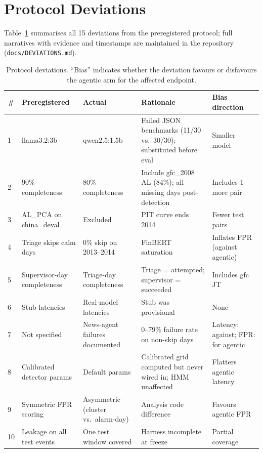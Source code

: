 \documentclass[10pt,a4paper]{article}
\begin{document}
\appendix

\section{Protocol Deviations}\label{app:deviations}

Table~\ref{tab:deviations} summarises all 15 deviations from the preregistered
protocol; full narratives with evidence and timestamps are maintained in the
repository (\texttt{docs/DEVIATIONS.md}).

\begin{table}[htbp]
\centering
\scriptsize
\setlength{\tabcolsep}{4pt}
\caption{Protocol deviations. ``Bias'' indicates whether the deviation favours
or disfavours the agentic arm for the affected endpoint.}
\label{tab:deviations}
\begin{tabular}{@{}p{0.5cm} p{3.1cm} p{3.3cm} p{4.2cm} p{3.2cm}@{}}
\toprule
\# & Preregistered & Actual & Rationale & Bias direction \\
\midrule
1 & llama3.2:3b & qwen2.5:1.5b & Failed JSON benchmarks (11/30 vs.\ 30/30);
    substituted before eval & Smaller model \\
2 & 90\% completeness & 80\% completeness & Include gfc\_2008 AL (84\%); all
    missing days post-detection & Includes 1 more pair \\
3 & AL\_PCA on china\_deval & Excluded & PIT curve ends 2014 & Fewer test pairs \\
4 & Triage skips calm days & 0\% skip on 2013--2014 & FinBERT saturation &
    Inflates FPR (against agentic) \\
5 & Supervisor-day completeness & Triage-day completeness & Triage = attempted;
    supervisor = succeeded & Includes gfc JT \\
6 & Stub latencies & Real-model latencies & Stub was provisional & None \\
7 & Not specified & News-agent failures documented & 0--79\% failure rate on
    non-skip days & Latency: against; FPR: for agentic \\
8 & Calibrated detector params & Default params & Calibrated grid computed but
    never wired in; HMM unaffected & Flatters agentic latency \\
9 & Symmetric FPR scoring & Asymmetric (cluster vs.\ alarm-day) & Analysis code
    difference & Favours agentic FPR \\
10 & Leakage on all test events & One test window covered & Harness incomplete
    at freeze & Partial coverage \\

\end{tabular}
\end{table}
\end{document}
